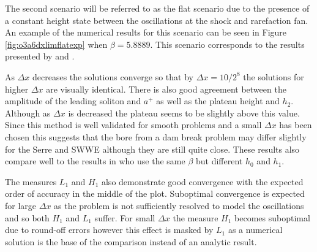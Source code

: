 \documentclass[SingleSpace,12pt,Proceedings]{Serre_ASCE}
\begin{document}
The second scenario will be referred to as the flat scenario due to the presence of a constant height state between the oscillations at the shock and rarefaction fan. An example of the numerical results for this scenario can be seen in Figure \ref{fig:o3a6dxlimflatexp} when $\beta = 5.8889$. This scenario corresponds to the results presented by  and . 

As $\Delta x$ decreases the solutions converge so that by $\Delta x = 10 / 2^8$ the solutions for higher $\Delta x$ are visually identical. There is also good agreement between the amplitude of the leading soliton and $a^+$ as well as the plateau height and $h_2$. Although as $\Delta x$ is decreased the plateau seems to be slightly above this value. Since this method is well validated for smooth problems and a small $\Delta x$ has been chosen this suggests that the bore from a dam break problem may differ slightly for the Serre and SWWE although they are still quite close. These results also compare well to the results in  who use the same $\beta$ but different $h_0$ and $h_1$. 

The measures $L_1$ and $H_1$ also demonstrate good convergence with the expected order of accuracy in the middle of the plot. Suboptimal convergence is expected for large $\Delta x$ as the problem is not sufficiently resolved to model the oscillations and so both $H_1$ and $L_1$ suffer. For small $\Delta x$ the measure $H_1$ becomes suboptimal due to round-off errors however this effect is masked by $L_1$ as a numerical solution is the base of the comparison instead of an analytic result.
\end{document}
